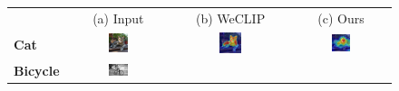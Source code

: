 \begin{figure}[ht]
  \centering
  \setlength{\tabcolsep}{2pt} %
  \renewcommand{\arraystretch}{0.9}

  \begin{tcolorbox}[colframe=black!60, colback=white, boxrule=0.8pt, arc=2pt, left=2pt, right=2pt, top=2pt, bottom=2pt]
    \centering
    \begin{tabular}{m{3cm} c c c} %

       & (a) Input                                                    & (b) WeCLIP & (c) Ours
      \\
      [1mm]

      {\textbf{Cat}}
       & \includegraphics[width=0.20\textwidth,height=0.20\textwidth]
      {figures/originals/2007_003778}
       & \includegraphics[width=0.20\textwidth,height=0.20\textwidth]
      {figures/val_cams/weclip/2007_003778_7}
       & \includegraphics[width=0.20\textwidth,height=0.20\textwidth]
      {figures/val_cams/ours/2007_003778_7}
      \\
      \textbf{Bicycle}
       & \includegraphics[width=0.20\textwidth,height=0.20\textwidth]
      {figures/originals/2011_000453}

\end{tabular}
\end{tcolorbox}
\end{figure}
